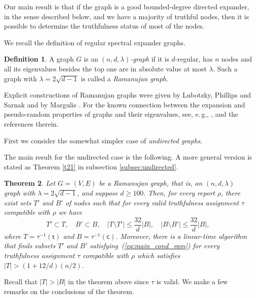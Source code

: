 \documentclass[11pt]{article}
\numberwithin{equation}{section}
\newtheorem{theorem}{Theorem}[section]
\theoremstyle{definition}
\newtheorem{definition}[theorem]{Definition}
\theoremstyle{plain}
\newcommand{\eg}{e.\,g.}
\begin{document}
Our main result is that if the graph is a good bounded-degree 
directed expander, in the sense described below,
and we have a majority of truthful nodes, then it is possible to
%
determine  %
the truthfulness status of
most of the nodes.   %
%
%

We recall the
%
definition of regular spectral expander graphs.
%
\begin{definition} \label{dec:ndl}
A graph $G$ is an
\emph{$(n,d, \lambda)$-graph} if it is $d$-regular, has $n$ nodes and all
its eigenvalues besides the top one are in absolute value at most
$\lambda$.  Such a graph with $\lambda=2 \sqrt {d-1}$ is called a
\emph{Ramanujan graph}.
\end{definition} 
%
%
%
Explicit constructions of Ramanujan graphs were given by Lubotzky,
Phillips and Sarnak \cite{LPS} and by Margulis \cite{Ma}.
%
%
For the known connection between the 
expansion and pseudo-random properties of graphs and their eigenvalues,
see, \eg, \cite{AC}, \cite{HLW} and the references therein.

%
%
%
%
%
%
%
%
%

%
%
%
%
%
%
%
%
%
%

%
%
%
%
%
%
%
First we consider the somewhat simpler case of \emph{undirected graphs}.
%
%

%

%
The main result for the undirected case
is the following. A more general version is stated as Theorem 
\ref{t21} in subsection \ref{subsec:undirected}.

%
%
%
\begin{theorem}  
\label{t11}
Let $G = (V,E)$ be a Ramanujan graph, that is, an
$(n,d,\lambda)$ graph with $\lambda =2 \sqrt{d-1}$, and
suppose $d \geq 100$.  Then, for every report
$\rho$, there exist sets $T'$ and $B'$ of nodes
such that for every valid truthfulness assignment
$\tau$ compatible with $\rho$ we have
\begin{equation}
\label{eq:main_cond_ram}
T' \subset T, \quad B' \subset B, \quad
|T \setminus T'| \leq \frac{32}{d} |B| , \quad
|B \setminus B'| \leq  \frac{32}{d} |B|,
\end{equation}
where $T = \tau^{-1}(\mathsf{t})$ and $B =  \tau^{-1}(\mathsf{c})$.
%
%
%
%
%
%
Moreover, there is a linear-time
algorithm that finds subsets $T'$ and 
$B'$ satisfying~(\ref{eq:main_cond_ram})
for every truthfulness assignment $\tau$  
compatible with $\rho$ which satisfies
$|T| >  (1 +  {12}/{d}) ({n}/{2})$.
\end{theorem}
Recall that $|T| > |B|$ in the theorem  above since $\tau$ is valid.
%
%
%
%
We make a few remarks on the conclusions of the theorem.
%
%
\end{document}
